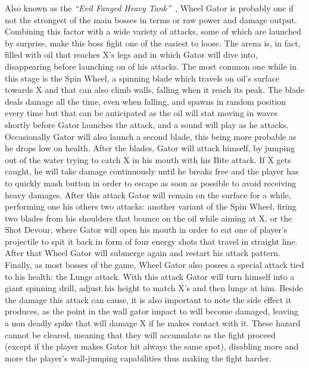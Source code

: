 Also known as the \textit{``Evil Fanged Heavy Tank''}~\cite{book:MMX_Complete_art}, Wheel Gator is probably one if not the strongest of the main bosses in terms or raw power and damage output. Combining this factor with a wide variety of attacks, some of which are launched by surprise, make this boss fight one of the easiest to loose. The arena is, in fact, filled with oil that reaches X's legs and in which Gator will dive into, disappearing before launching on of his attacks. The most common one while in this stage is the Spin Wheel, a spinning blade which travels on oil's surface towards X and that can also climb walls, falling when it reach its peak. The blade deals damage all the time, even when falling, and spawns in random position every time but that can be anticipated as the oil will stat moving in waves shortly before Gator launches the attack, and a sound will play as he attacks. Occasionally Gator will also launch a second blade, this being more probable as he drops low on health. After the blades, Gator will attack himself, by jumping out of the water trying to catch X in his mouth with his Bite attack. If X gets caught, he will take damage continuously until he breaks free and the player has to quickly mash button in order to escape as soon as possible to avoid receiving heavy damages. After this attack Gator will remain on the surface for a while, performing one his others two attacks: another variant of the Spin Wheel, firing two blades from his shoulders that bounce on the oil while aiming at X, or the Shot Devour, where Gator will open his mouth in order to eat one of player's projectile to spit it back in form of four energy shots that travel in straight line. After that Wheel Gator will submerge again and restart his attack pattern. Finally, as most bosses of the game, Wheel Gator also posses a special attack tied to his health: the Lunge attack. With this attack Gator will turn himself into a giant spinning drill, adjust his height to match X's and then lunge at him. Beside the damage this attack can cause, it is also important to note the side effect it produces, as the point in the wall gator impact to will become damaged, leaving a non deadly spike that will damage X if he makes contact with it. These hazard cannot be cleared, meaning that they will accumulate as the fight proceed (except if the player makes Gator hit always the same spot), disabling more and more the player's wall-jumping capabilities thus making the fight harder.


